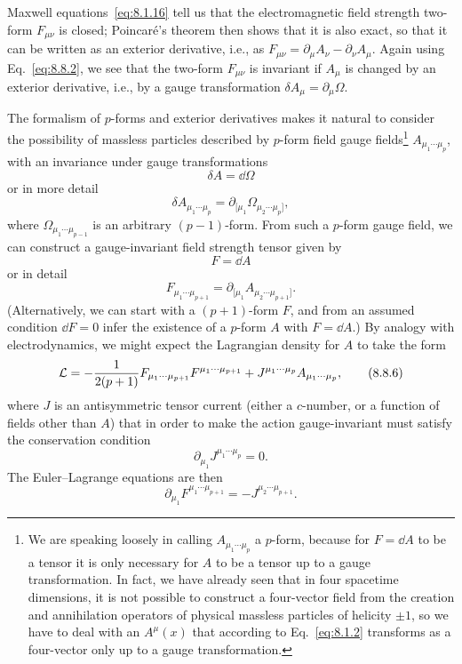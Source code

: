 Maxwell equations~\eqref{eq:8.1.16} tell us that the electromagnetic field strength
two-form $F_{\mu\nu}$ is closed; Poincaré's theorem then shows that it is also
exact, so that it can be written as an exterior derivative, i.e., as
$F_{\mu\nu}=\partial_\mu A_\nu-\partial_\nu A_\mu$. Again using Eq.~\eqref{eq:8.8.2},
we see that the two-form $F_{\mu\nu}$ is invariant if $A_\mu$ is changed by
an exterior derivative, i.e., by a gauge transformation
$\delta A_\mu=\partial_\mu\Omega$.

The formalism of $p$-forms and exterior derivatives makes it natural to
consider the possibility of massless particles described by $p$-form field
gauge fields\footnote{We are speaking loosely in calling
$A_{\mu_1\cdots\mu_p}$ a $p$-form, because for $F=\dd A$ to be a tensor it is
only necessary for $A$ to be a tensor up to a gauge transformation. In fact,
we have already seen that in four spacetime dimensions, it is not possible to
construct a four-vector field from the creation and annihilation operators of
physical massless particles of helicity $\pm1$, so we have to deal with an
$A^\mu(x)$ that according to Eq.~\eqref{eq:8.1.2} transforms as a four-vector only up
to a gauge transformation.} $A_{\mu_1\cdots\mu_p}$, with an invariance under
gauge transformations
\begin{equation}
\delta A=\dd\Omega
\tag{8.8.3}\label{eq:8.8.3}
\end{equation}
or in more detail
\[
\delta A_{\mu_1\cdots\mu_p}
=\partial_{[\mu_1}\Omega_{\mu_2\cdots\mu_p]},
\]
where $\Omega_{\mu_1\cdots\mu_{p-1}}$ is an arbitrary $(p-1)$-form. From such
a $p$-form gauge field, we can construct a gauge-invariant field strength
tensor given by
\begin{equation}
F=\dd A
\tag{8.8.4}\label{eq:8.8.4}
\end{equation}
or in detail
\begin{equation}
F_{\mu_1\cdots\mu_{p+1}}
=\partial_{[\mu_1}A_{\mu_2\cdots\mu_{p+1}]}.
\tag{8.8.5}\label{eq:8.8.5}
\end{equation}
(Alternatively, we can start with a $(p+1)$-form $F$, and from an assumed
condition $\dd F=0$ infer the existence of a $p$-form $A$ with $F=\dd A$.) By
analogy with electrodynamics, we might expect the Lagrangian density for $A$
to take the form
\begin{equation}
\mathcal L=-{1\over2(p+1)}F_{\mu_1\cdots\mu_{p+1}}
F^{\mu_1\cdots\mu_{p+1}}+J^{\mu_1\cdots\mu_p}A_{\mu_1\cdots\mu_p},
\tag{8.8.6}\label{eq:8.8.6}
\end{equation}
where $J$ is an antisymmetric tensor current (either a $c$-number, or a
function of fields other than $A$) that in order to make the action
gauge-invariant must satisfy the conservation condition
\begin{equation}
\partial_{\mu_1}J^{\mu_1\cdots\mu_p}=0.
\tag{8.8.7}\label{eq:8.8.7}
\end{equation}
The Euler--Lagrange equations are then
\begin{equation}
\partial_{\mu_1}F^{\mu_1\cdots\mu_{p+1}}=-J^{\mu_2\cdots\mu_{p+1}}.
\tag{8.8.8}\label{eq:8.8.8}
\end{equation}

